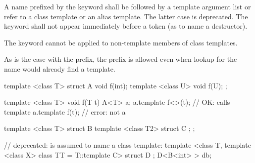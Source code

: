 \pnum
A name prefixed by the keyword
shall be followed by a template argument list or
refer to a class template or an alias template.
The latter case is deprecated.
The keyword  shall not appear immediately
before a \tcode{\~} token (as to name a destructor).
\begin{note}
The keyword
cannot be applied to non-template members of class templates.
\end{note}
\begin{note}
As is the case with the
prefix, the
prefix is allowed
even when lookup for the name would already find a template.
\end{note}
\begin{example}
\begin{codeblock}
template <class T> struct A {
  void f(int);
  template <class U> void f(U);
};

template <class T> void f(T t) {
  A<T> a;
  a.template f<>(t);                    // OK: calls template
  a.template f(t);                      // error: not a 
}

template <class T> struct B {
  template <class T2> struct C { };
};

// deprecated:  is assumed to name a class template:
template <class T, template <class X> class TT = T::template C> struct D { };
D<B<int> > db;
\end{codeblock}
\end{example}

